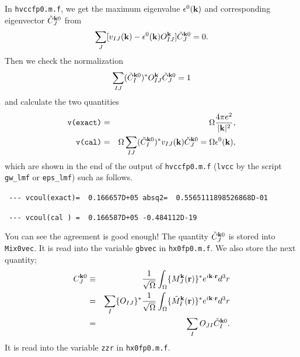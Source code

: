 \documentclass[a4paper,10pt,epsf,fleqn]{article}
\begin{document}
In \verb|hvccfp0.m.f|, we get the maximum eigenvalue $\epsilon^0({\bf k})$ 
and corresponding eigenvector $\tilde{C}^{{\bf k}0}_J$ from 
\begin{eqnarray}
   \sum_J[v_{IJ}({\bf k}) - \epsilon^0({\bf k})
   O^{\bf k}_{IJ}] \tilde{C}^{{\bf k}0}_J=0.
\end{eqnarray}
Then we check the normalization
\begin{eqnarray}
  \sum_{IJ}( \tilde{C}^{{\bf k}0}_I )^* O_{IJ}^{\bf k}
              \tilde{C}^{{\bf k}0}_J = 1
\end{eqnarray}
and calculate the two quantities
\begin{eqnarray} 
   \verb|v(exact)|
    &=& \Omega \frac{4\pi e^2}{|{\bf k}|^2}, \\
   \verb|v(cal)| 
    &=& \Omega \sum_{IJ}( \tilde{C}^{{\bf k}0}_I )^*v_{IJ}({\bf k}) 
              \tilde{C}^{{\bf k}0}_J
     =  \Omega \epsilon^0({\bf k}),
\end{eqnarray}
which are shown in the end of the output of \verb|hvccfp0.m.f| 
(\verb|lvcc| by the script \verb|gw_lmf| or \verb|eps_lmf|) such as follows.

\vspace{\baselineskip}

\verb| --- vcoul(exact)=  0.166657D+05 absq2=  0.5565111898526868D-01|

\verb| --- vcoul(cal ) =  0.166587D+05 -0.484112D-19|

\vspace{\baselineskip}

You can see the agreement is good enough!
The quantity $\tilde{C}^{{\bf k}0}_J$ is stored into \verb|Mix0vec|.
It is read into the variable \verb|gbvec| in \verb|hx0fp0.m.f|.
We also store the next quantity;
\begin{eqnarray}
  C^{{\bf k}0}_J
  &\equiv& \frac{1}{\sqrt{\Omega}}\int_{\Omega}
     \{ M_J^{\bf k}({\bf r}) \}^* e^{i{\bf k \cdot r}}d^3r \nonumber \\
  &=& \sum_I \{ O_{IJ} \}^* \frac{1}{\sqrt{\Omega}}\int_{\Omega}
     \{ \tilde{M}_I^{\bf k}({\bf r}) \}^* e^{i{\bf k \cdot r}}d^3r \nonumber \\
  &=& \sum_I O_{JI} \tilde{C}^{{\bf k}0}_I.
\end{eqnarray}
It is read into the variable \verb|zzr| in \verb|hx0fp0.m.f|.
\end{document}
